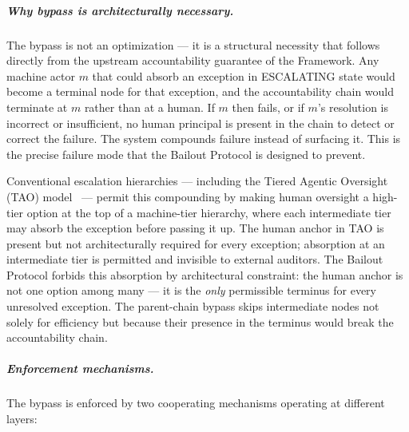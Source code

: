 \subparagraph{Why bypass is architecturally necessary.} The bypass is not an optimization — it is a structural necessity that follows directly from the upstream accountability guarantee of the \bxthree{} Framework. Any machine actor $m$ that could absorb an exception in ESCALATING state would become a terminal node for that exception, and the accountability chain would terminate at $m$ rather than at a human. If $m$ then fails, or if $m$'s resolution is incorrect or insufficient, no human principal is present in the chain to detect or correct the failure. The system compounds failure instead of surfacing it. This is the precise failure mode that the Bailout Protocol is designed to prevent.

Conventional escalation hierarchies — including the Tiered Agentic Oversight (TAO) model~\cite{kim2025tao} — permit this compounding by making human oversight a high-tier option at the top of a machine-tier hierarchy, where each intermediate tier may absorb the exception before passing it up. The human anchor in TAO is present but not architecturally required for every exception; absorption at an intermediate tier is permitted and invisible to external auditors. The Bailout Protocol forbids this absorption by architectural constraint: the human anchor is not one option among many — it is the \emph{only} permissible terminus for every unresolved exception. The parent-chain bypass skips intermediate nodes not solely for efficiency but because their presence in the terminus would break the accountability chain.

\subparagraph{Enforcement mechanisms.} The bypass is enforced by two cooperating mechanisms operating at different layers:

